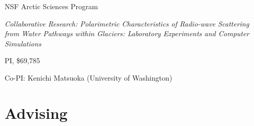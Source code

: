 \documentclass[11pt]{article}
\renewenvironment{itemize}{
  \begin{list}{}{
    \setlength{\leftmargin}{1.5em}
    \setlength{\itemsep}{0pt}
    \setlength{\parskip}{0pt}
  }
}{
  \end{list}
}
\begin{document}
\begin{itemize}
\item[09/2005-08/2010] NSF Arctic Sciences Program
\begin{itemize}
  \item \textit{Collaborative Research: Polarimetric Characteristics of Radio-wave 
  Scattering from Water Pathways within Glaciers: Laboratory Experiments and Computer 
  Simulations}
  \item PI, \$69,785
  \item Co-PI: Kenichi Matsuoka (University of Washington)
\end{itemize}
\end{itemize}

\pagebreak

\section*{Advising}
\end{document}
